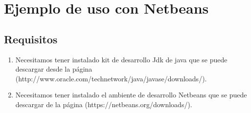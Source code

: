 \chapter{Ejemplo de uso con Netbeans} \label{}



	\section{Requisitos}

	\begin{enumerate}

	\item Necesitamos tener instalado kit de desarrollo Jdk de java que se puede descargar desde la página (http://www.oracle.com/technetwork/java/javase/downloads/).

	\item Necesitamos tener instalado el ambiente de desarrollo Netbeans que se puede descargar de la página (https://netbeans.org/downloads/).
	\end{enumerate}

